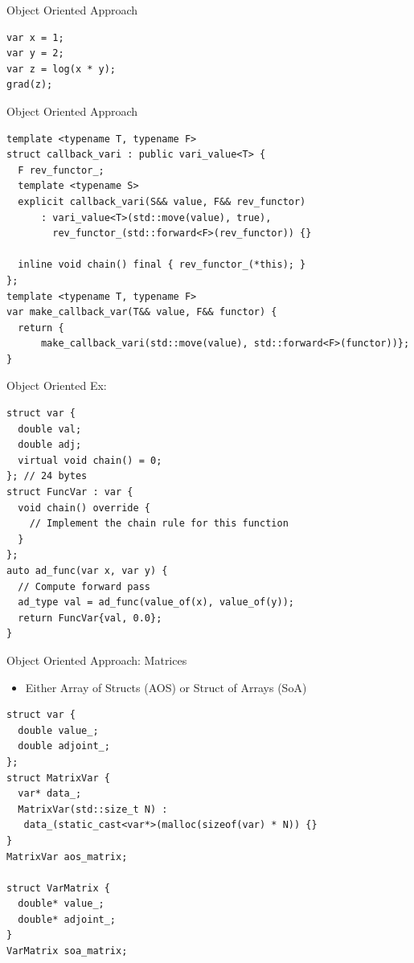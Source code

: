 \documentclass[dvipsnames]{beamer}
\begin{document}
\begin{frame}[fragile]{Object Oriented Approach}
\begin{verbatim}
var x = 1;
var y = 2;
var z = log(x * y);
grad(z);
\end{verbatim}
\end{frame}

\begin{frame}[fragile]{Object Oriented Approach}
\begin{verbatim}
template <typename T, typename F>
struct callback_vari : public vari_value<T> {
  F rev_functor_;
  template <typename S>
  explicit callback_vari(S&& value, F&& rev_functor)
      : vari_value<T>(std::move(value), true),
        rev_functor_(std::forward<F>(rev_functor)) {}

  inline void chain() final { rev_functor_(*this); }
};
template <typename T, typename F>
var make_callback_var(T&& value, F&& functor) {
  return {
      make_callback_vari(std::move(value), std::forward<F>(functor))};
}

\end{verbatim}
\end{frame}

\begin{frame}[fragile]{Object Oriented Ex:}
\begin{verbatim}
struct var {
  double val;
  double adj;
  virtual void chain() = 0;
}; // 24 bytes
struct FuncVar : var {
  void chain() override {
    // Implement the chain rule for this function
  }
};
auto ad_func(var x, var y) {
  // Compute forward pass
  ad_type val = ad_func(value_of(x), value_of(y));
  return FuncVar{val, 0.0};
}
\end{verbatim}
\end{frame}

\begin{frame}[fragile]{Object Oriented Approach: Matrices}
\begin{itemize}
    \item Either Array of Structs (AOS) or Struct of Arrays (SoA)
\end{itemize}

\begin{verbatim}
struct var {
  double value_;
  double adjoint_;
};
struct MatrixVar {
  var* data_;
  MatrixVar(std::size_t N) :
   data_(static_cast<var*>(malloc(sizeof(var) * N)) {}
}
MatrixVar aos_matrix;

struct VarMatrix {
  double* value_;
  double* adjoint_;
}
VarMatrix soa_matrix;
\end{verbatim}
\end{frame}
\end{document}
